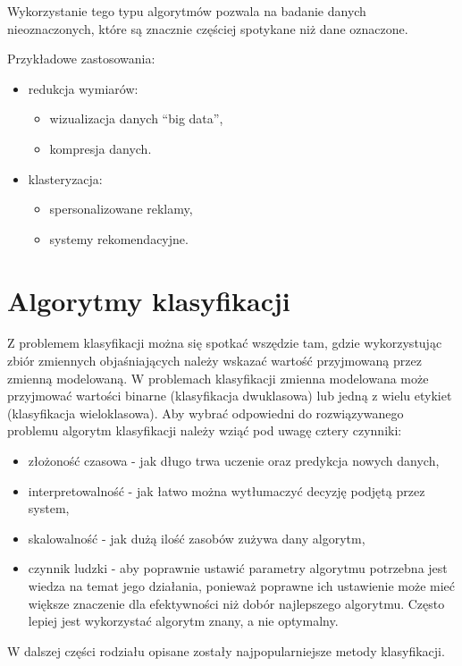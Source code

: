 \begin{itemize}
\begin{itemize}
    \end{itemize} 
    Wykorzystanie tego typu algorytmów pozwala na badanie danych nieoznaczonych,
    które są znacznie częściej spotykane niż dane oznaczone.
    
    Przykładowe zastosowania:
    \begin{itemize}
        \item redukcja wymiarów:
        \begin{itemize}
            \item wizualizacja danych ``big data'',
            \item kompresja danych.
        \end{itemize}
        \item klasteryzacja:
        \begin{itemize}
            \item spersonalizowane reklamy,
            \item systemy rekomendacyjne.
        \end{itemize}
    \end{itemize}
\end{itemize} 
\section{Algorytmy klasyfikacji}
Z problemem klasyfikacji można się spotkać wszędzie tam, gdzie wykorzystując
zbiór zmiennych objaśniających należy wskazać wartość przyjmowaną przez zmienną
modelowaną. W problemach klasyfikacji zmienna modelowana może przyjmować wartości
binarne (klasyfikacja dwuklasowa) lub jedną z wielu etykiet (klasyfikacja wieloklasowa).
Aby wybrać odpowiedni do rozwiązywanego problemu algorytm klasyfikacji należy wziąć 
pod uwagę cztery czynniki:
\begin{itemize}
    \item złożoność czasowa - jak długo trwa uczenie oraz predykcja nowych danych,
    \item interpretowalność - jak łatwo można wytłumaczyć decyzję podjętą przez 
    system,
    \item skalowalność - jak dużą ilość zasobów zużywa dany algorytm,
    \item czynnik ludzki - aby poprawnie ustawić parametry algorytmu potrzebna
    jest wiedza na temat jego działania, ponieważ poprawne ich ustawienie może 
    mieć większe znaczenie dla efektywności niż dobór najlepszego algorytmu. Często
    lepiej jest wykorzystać algorytm znany, a nie optymalny.
\end{itemize}
W dalszej części rodziału opisane zostały najpopularniejsze metody klasyfikacji.
